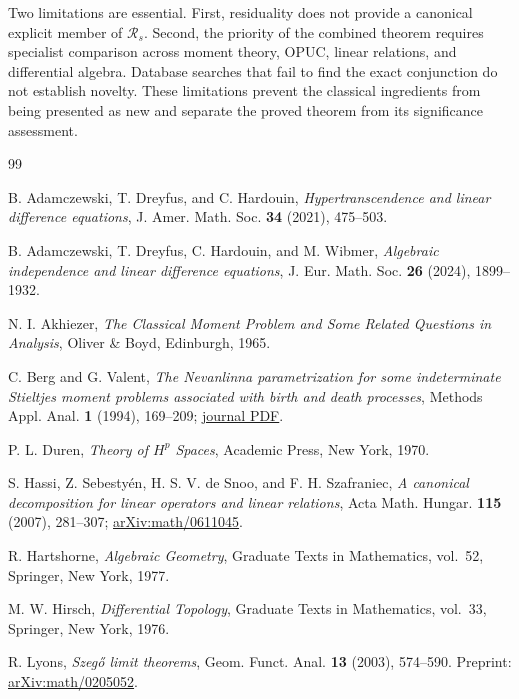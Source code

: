 \documentclass[11pt]{article}
\newcommand{\cR}{\mathcal R}
\begin{document}
Two limitations are essential.  First, residuality does not provide a canonical explicit member
of $\cR_s$.  Second, the priority of the combined theorem requires specialist comparison across
moment theory, OPUC, linear relations, and differential algebra.  Database searches that fail to
find the exact conjunction do not establish novelty.  These limitations prevent the classical
ingredients from being presented as new and separate the proved theorem from its significance
assessment.

\begin{thebibliography}{99}

B. Adamczewski, T. Dreyfus, and C. Hardouin,
\emph{Hypertranscendence and linear difference equations},
J. Amer. Math. Soc. \textbf{34} (2021), 475--503.

B. Adamczewski, T. Dreyfus, C. Hardouin, and M. Wibmer,
\emph{Algebraic independence and linear difference equations},
J. Eur. Math. Soc. \textbf{26} (2024), 1899--1932.

N. I. Akhiezer,
\emph{The Classical Moment Problem and Some Related Questions in Analysis},
Oliver \& Boyd, Edinburgh, 1965.

C. Berg and G. Valent,
\emph{The Nevanlinna parametrization for some indeterminate Stieltjes moment problems
associated with birth and death processes},
Methods Appl. Anal. \textbf{1} (1994), 169--209;
\href{https://www.intlpress.com/site/pub/files/_fulltext/journals/maa/1994/0001/0002/MAA-1994-0001-0002-a003.pdf}{journal PDF}.

P. L. Duren,
\emph{Theory of $H^p$ Spaces},
Academic Press, New York, 1970.

S. Hassi, Z. Sebesty\'en, H. S. V. de Snoo, and F. H. Szafraniec,
\emph{A canonical decomposition for linear operators and linear relations},
Acta Math. Hungar. \textbf{115} (2007), 281--307;
\href{https://arxiv.org/abs/math/0611045}{arXiv:math/0611045}.

R. Hartshorne,
\emph{Algebraic Geometry},
Graduate Texts in Mathematics, vol.~52, Springer, New York, 1977.

M. W. Hirsch,
\emph{Differential Topology},
Graduate Texts in Mathematics, vol.~33, Springer, New York, 1976.

R. Lyons,
\emph{Szeg\H{o} limit theorems},
Geom. Funct. Anal. \textbf{13} (2003), 574--590.
Preprint: \href{https://arxiv.org/abs/math/0205052}{arXiv:math/0205052}.


\end{thebibliography}
\end{document}
